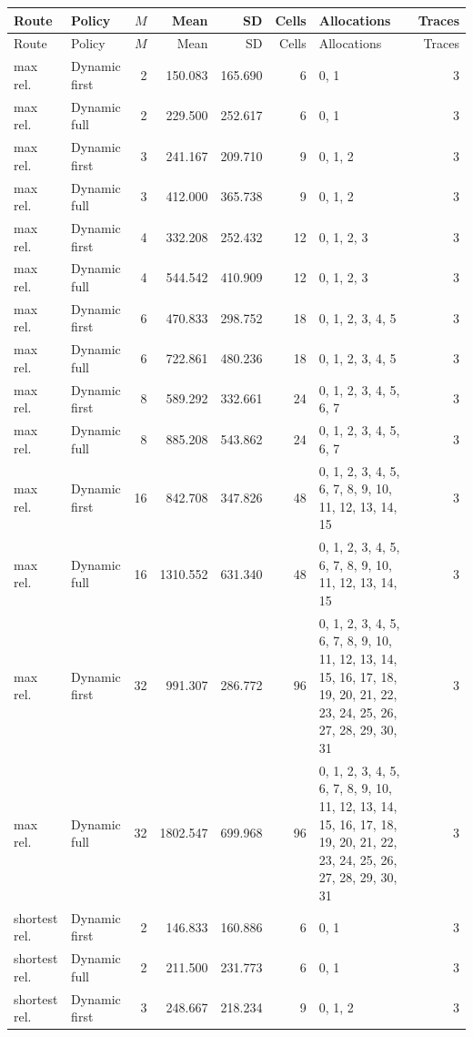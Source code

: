 \documentclass[10pt,a4paper]{article}
\begin{document}
\tiny\setlength{\tabcolsep}{2pt}\begin{longtable}{@{}p{23mm}p{29mm}rrrrp{36mm}r@{}}
\toprule Route & Policy & $M$ & Mean & SD & Cells & Allocations & Traces \\ \midrule\endfirsthead
\toprule Route & Policy & $M$ & Mean & SD & Cells & Allocations & Traces \\ \midrule\endhead
\bottomrule\endfoot
max rel. & Dynamic first & 2 & 150.083 & 165.690 & 6 & 0, 1 & 3 \\
max rel. & Dynamic full & 2 & 229.500 & 252.617 & 6 & 0, 1 & 3 \\
max rel. & Dynamic first & 3 & 241.167 & 209.710 & 9 & 0, 1, 2 & 3 \\
max rel. & Dynamic full & 3 & 412.000 & 365.738 & 9 & 0, 1, 2 & 3 \\
max rel. & Dynamic first & 4 & 332.208 & 252.432 & 12 & 0, 1, 2, 3 & 3 \\
max rel. & Dynamic full & 4 & 544.542 & 410.909 & 12 & 0, 1, 2, 3 & 3 \\
max rel. & Dynamic first & 6 & 470.833 & 298.752 & 18 & 0, 1, 2, 3, 4, 5 & 3 \\
max rel. & Dynamic full & 6 & 722.861 & 480.236 & 18 & 0, 1, 2, 3, 4, 5 & 3 \\
max rel. & Dynamic first & 8 & 589.292 & 332.661 & 24 & 0, 1, 2, 3, 4, 5, 6, 7 & 3 \\
max rel. & Dynamic full & 8 & 885.208 & 543.862 & 24 & 0, 1, 2, 3, 4, 5, 6, 7 & 3 \\
max rel. & Dynamic first & 16 & 842.708 & 347.826 & 48 & 0, 1, 2, 3, 4, 5, 6, 7, 8, 9, 10, 11, 12, 13, 14, 15 & 3 \\
max rel. & Dynamic full & 16 & 1310.552 & 631.340 & 48 & 0, 1, 2, 3, 4, 5, 6, 7, 8, 9, 10, 11, 12, 13, 14, 15 & 3 \\
max rel. & Dynamic first & 32 & 991.307 & 286.772 & 96 & 0, 1, 2, 3, 4, 5, 6, 7, 8, 9, 10, 11, 12, 13, 14, 15, 16, 17, 18, 19, 20, 21, 22, 23, 24, 25, 26, 27, 28, 29, 30, 31 & 3 \\
max rel. & Dynamic full & 32 & 1802.547 & 699.968 & 96 & 0, 1, 2, 3, 4, 5, 6, 7, 8, 9, 10, 11, 12, 13, 14, 15, 16, 17, 18, 19, 20, 21, 22, 23, 24, 25, 26, 27, 28, 29, 30, 31 & 3 \\
shortest rel. & Dynamic first & 2 & 146.833 & 160.886 & 6 & 0, 1 & 3 \\
shortest rel. & Dynamic full & 2 & 211.500 & 231.773 & 6 & 0, 1 & 3 \\
shortest rel. & Dynamic first & 3 & 248.667 & 218.234 & 9 & 0, 1, 2 & 3 \\

\end{longtable}
\end{document}
